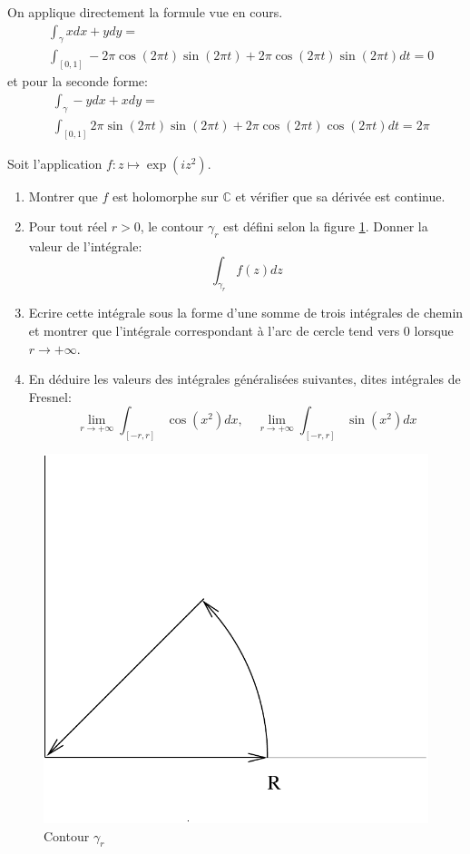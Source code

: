 \documentclass[a4paper, 12pt]{amsart}
\begin{document}
On applique directement la formule vue en cours.
\begin{align*}
&\int_{\gamma} x dx + y dy = \\ 
& \int_{[0,1]} - 2 \pi \cos\left( 2 \pi t \right) \sin\left( 2 \pi t \right) + 2 \pi \cos\left( 2 \pi t \right) \sin\left( 2 \pi t \right) dt = 0
\end{align*}
et pour la seconde forme:
\begin{align*}
&\int_{\gamma} -y dx + x dy = \\ 
& \int_{[0,1]}  2 \pi \sin\left( 2 \pi t \right) \sin\left( 2 \pi t \right) + 2 \pi \cos\left( 2 \pi t \right) \cos\left( 2 \pi t \right) dt = 2 \pi 
\end{align*}
\begin{fex}
 Soit l'application $f \colon z \mapsto \exp\left(i z^2\right)$. 
\begin{enumerate}
  \item Montrer que $f$ est holomorphe sur $\mathbb{C}$ et vérifier que sa
  dérivée est continue.
  \item Pour tout réel $r > 0$, le contour $\gamma_r$ est défini selon la figure
  \ref{fig:contour2}. Donner la valeur de l'intégrale:
  \[
  \int_{\gamma_r} f(z) dz
  \]
  \item Ecrire cette intégrale sous la forme d'une somme de trois
  intégrales de chemin et montrer que l'intégrale correspondant à l'arc de
  cercle tend vers 0 lorsque $r \to +\infty$.
  \item En déduire les valeurs des intégrales généralisées suivantes, dites
  intégrales de Fresnel:
  \[
  \lim_{r \to +\infty} \int_{[-r,r]} \cos(x^2) dx, \quad  \lim_{r \to +\infty}
  \int_{[-r,r]} \sin(x^2) dx
  \]
\end{enumerate}
\end{fex}
 \begin{figure}[ht]
\includegraphics[scale=0.3]{contour_fresnel.pdf}
\caption{Contour $\gamma_r$}\label{fig:contour2}
\end{figure}
\end{document}
